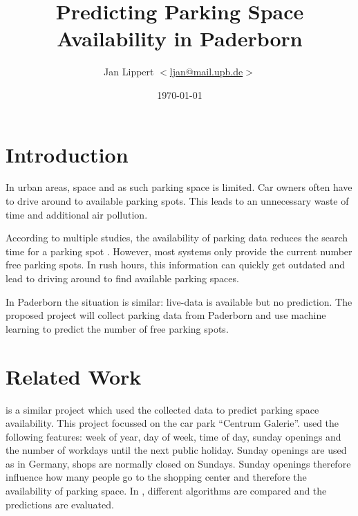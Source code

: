 \documentclass[journal,10pt]{IEEEtran}
\title{Predicting Parking Space Availability in Paderborn}
\author{Jan Lippert \(<\)\href{mailt:ljan@mail.upb.de}{ljan@mail.upb.de}\(>\)}
\date{\today}
\begin{document}
\maketitle

\section{Introduction}

In urban areas, space and as such parking space is limited. Car owners often have to drive around to available parking spots. This leads to an unnecessary waste of time and additional air pollution. 

According to multiple studies, the availability of parking data reduces the search time for a parking spot \cite{Asakura1994}\cite{Caicedo2010228}. However, most systems only provide the current number free parking spots. In rush hours, this information can quickly get outdated and lead to driving around to find available parking spaces.


In Paderborn the situation is similar: live-data is available but no prediction. The proposed project will collect parking data from Paderborn and use machine learning to predict the number of free parking spots.



\section{Related Work}

\cite{parkendd} is a similar project which used the collected data to predict parking space availability. This project focussed on the car park ``Centrum Galerie''. \cite{parkendd} used the following features: week of year, day of week, time of day, sunday openings and the number of workdays until the next public holiday. Sunday openings are used as in Germany, shops are normally closed on Sundays. Sunday openings therefore influence how many people go to the shopping center and therefore the availability of parking space. In \cite{parkendd}, different algorithms are compared and the predictions are evaluated.
\end{document}
